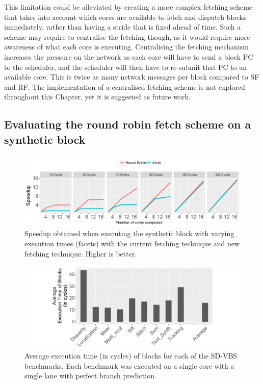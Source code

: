This limitation could be alleviated by creating a more complex fetching scheme that takes into account which cores are available to fetch and dispatch blocks immediately, rather than having a stride that is fixed ahead of time.
Such a scheme may require to centralise the fetching though, as it would require more awareness of what each core is executing.
Centralising the fetching mechanism increases the pressure on the network as each core will have to send a block PC to the scheduler, and the scheduler will then have to re-submit that PC to an available core.
This is twice as many network messages per block compared to SF and RF.
The implementation of a centralised fetching scheme is not explored throughout this Chapter, yet it is suggested as future work.

\subsection{Evaluating the round robin fetch scheme on a synthetic block}

\begin{figure}[t]
    \centering
    \includegraphics[width=1\textwidth]{chapter3/graphics/motivation_fetch.pdf}
    \caption{Speedup obtained when executing the synthetic block with varying execution times (facets) with the current fetching technique and new fetching technique. Higher is better.}
    \label{fig:motiv_res}
\vspace{1em}
\end{figure}
\begin{figure}[t]
    \centering
    \includegraphics[width=1\textwidth]{chapter3/graphics/sdvbsav.pdf}
    \caption{Average execution time (in cycles) of blocks for each of the SD-VBS benchmarks. Each benchmark was executed on a single core with a single lane with perfect branch prediction.}
    \label{fig:svdbs_av}
\vspace{1em}
\end{figure}

